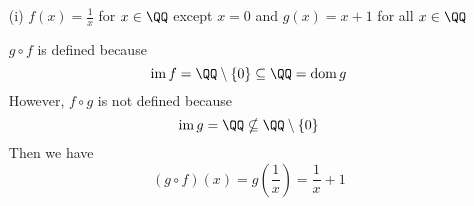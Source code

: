 \documentclass{article}
\DeclareMathOperator{\ima}{im}
\DeclareMathOperator{\dom}{dom}
\begin{document}
\begin{itemize}
\begin{itemize}
			\item[(i)] $f(x)=\frac{1}{x}$ for $x\in\QQ$ except $x=0$ and $g(x)=x+1$ for all $x\in\QQ$
				\begin{soln}
					$g\circ f$ is defined because
					\[\ima f = \QQ\setminus\left\{ 0 \right\} \subseteq \QQ = \dom g\]
					However, $f\circ g$ is not defined because
					\[\ima g = \QQ \nsubseteq \QQ\setminus\left\{ 0 \right\}\]
					Then we have
					\[(g\circ f)(x) = g\left( \frac{1}{x} \right) = \frac{1}{x} + 1\]
				\end{soln}
				
		\end{itemize}
		
\end{itemize}
\end{document}
